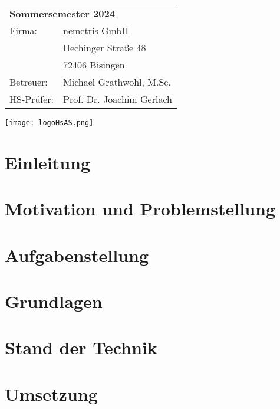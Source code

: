 \documentclass[
	ngerman,
	a4paper,
	twoside
]{scrbook}
\begin{document}
\begin{titlepage}
	\maketitle
	\begin{tabular}{ ll }
		\multicolumn{2}{l}{\textbf{Sommersemester 2024}} \\
		Firma: &  nemetris GmbH\\
	   	& Hechinger Straße 48\\
		& 72406 Bisingen\\
		Betreuer: & Michael Grathwohl, M.Sc.\\
		HS-Prüfer: & Prof. Dr. Joachim Gerlach
	\end{tabular}
	\vspace{0.5cm}
	\begin{flushright}
    	\texttt{[image: logoHsAS.png]}
	\end{flushright}	
\end{titlepage}




	\tableofcontents
	\listoffigures
	\listoftables
	\ifdeutsch
	\else
	\fi
	\printacronyms	


\chapter{Einleitung}
	
	
\chapter{Motivation und Problemstellung}	

	
	
\chapter{Aufgabenstellung}



\chapter{Grundlagen}



\chapter{Stand der Technik}



\chapter{Umsetzung}













	\printbibliography
\end{document}
